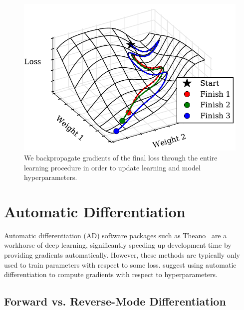 \documentclass{article}
\begin{document}
\begin{figure}[ht]
\vskip 0.2in
\begin{center}
\centerline{\includegraphics[width=\columnwidth]{../experiments/Jan_25_Figure_1/2/learning_curves.pdf}}
\caption{We backpropagate gradients of the final loss through the entire learning procedure in order to update learning and model hyperparameters.}
\label{fig:chaos}
\end{center}
\vskip -0.2in
\end{figure} 

\section{Automatic Differentiation}

Automatic differentiation (AD) software packages such as Theano~\cite{Bastien-Theano-2012, bergstra2010scipy} are a workhorse of deep learning, significantly speeding up development time by providing gradients automatically.
However, these methods are typically only used to train parameters with respect to some loss.
\citet{Autodiff14} suggest using automatic differentiation to compute gradients with respect to hyperparameters.

\subsection{Forward vs. Reverse-Mode Differentiation}
\end{document}

